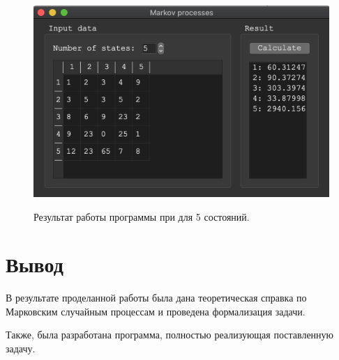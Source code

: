 \documentclass[a4paper,12pt]{article}
\begin{document}
	\newpage

	\begin{figure}[h!]
		\begin{center}
			{\includegraphics[scale = 0.7]{5.png}}
			\label{ris:3}
		\end{center}
		\caption{Результат работы программы при для 5 состояний.}
	\end{figure}
	
	\section*{Вывод}
	
	В результате проделанной работы была дана теоретическая справка по Марковским случайным процессам и проведена формализация задачи.
	
	Также, была разработана программа, полностью реализующая поставленную задачу. 
	
	
	
\end{document}
